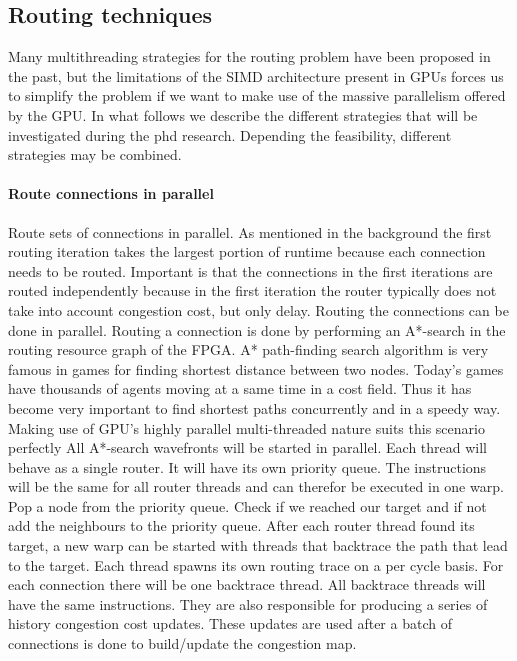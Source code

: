 \documentclass[a4paper,oneside,12pt]{article}
\begin{document}
\subsection{Routing techniques}\label{routetech}

Many multithreading strategies for the routing problem have been proposed in the past, but the limitations of the SIMD architecture present in GPUs forces us to simplify the problem if we want to make use of the massive parallelism offered by the GPU.
In what follows we describe the different strategies that will be investigated during the phd research. Depending the feasibility, different strategies may be combined.

\paragraph{Route connections in parallel} Route sets of connections in parallel.
As mentioned in the background the first routing iteration takes the largest portion of runtime because each connection needs to be routed.
Important is that the connections in the first iterations are routed independently because in the first iteration the router typically does not take into account congestion cost, but only delay. Routing the connections can be done in parallel. Routing a connection is done by performing an A*-search in the routing resource graph of the FPGA.
A* path-finding search algorithm is very famous in games for finding shortest distance between two nodes. Today's games have thousands of agents moving at a same time in a cost field. Thus it has become very important to find shortest paths concurrently and in a speedy way. Making use of GPU's highly parallel multi-threaded nature suits this scenario perfectly \cite{bleiweiss2008gpu,bleiweiss2012system}
 All A*-search wavefronts will be started in parallel. Each thread will behave as a single router. It will have its own priority queue. The instructions will be the same for all router threads and can therefor be executed in one warp. Pop a node from the priority queue. Check if we reached our target and if not add the neighbours to the priority queue. After each router thread found its target, a new warp can be started with threads that backtrace the path that lead to the target. Each thread spawns its own routing trace on a per cycle basis. For each connection there will be one backtrace thread. All backtrace threads will have the same instructions. They are also responsible for producing a series of history congestion cost updates. These updates are used after a batch of connections is done to build/update the congestion map.
\end{document}
